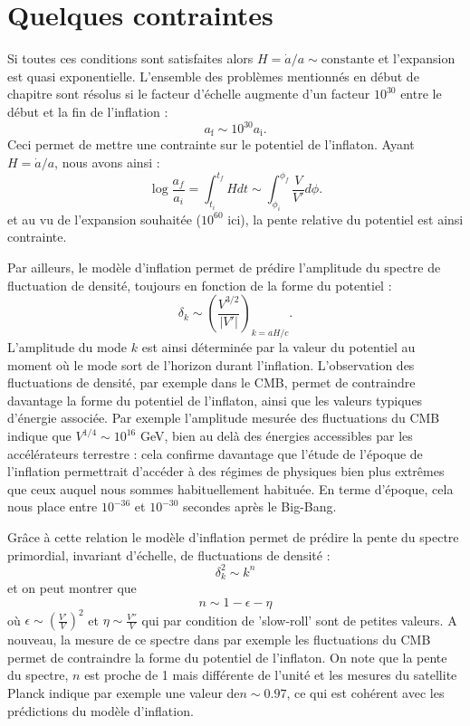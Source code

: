 \section{Quelques contraintes}
Si toutes ces conditions sont satisfaites alors $H=\dot a /a \sim \mathrm{constante}$ et l'expansion est quasi exponentielle. L'ensemble des problèmes mentionnés en début de chapitre sont résolus si le facteur d'échelle augmente d'un facteur $10^{30}$ entre le début et la fin de l'inflation :
\begin{equation}
a_\mathrm{f}\sim 10^{30} a_\mathrm{i}.
\end{equation}
Ceci permet de mettre une contrainte sur le potentiel de l'inflaton. Ayant $H=\dot a/a$, nous avons ainsi :
\begin{equation}
\log \frac{a_f}{a_i}=\int_{t_i}^{t_f} H dt \sim \int_{\phi_i}^{\phi_f}\frac{V}{V'}d \phi.
\end{equation}
et au vu de l'expansion souhaitée ($10^{60}$ ici), la pente relative du potentiel est ainsi contrainte.

Par ailleurs, le modèle d'inflation permet de prédire l'amplitude du spectre de fluctuation de densité, toujours en fonction de la forme du potentiel :
\begin{equation}
\delta_k\sim \left(\frac{V^{3/2}}{|V'|}\right)_{k=aH/c}.
\end{equation}
L'amplitude du mode $k$ est ainsi déterminée par la valeur du potentiel au moment où le mode sort de l'horizon durant l'inflation. L'observation des fluctuations de densité, par exemple dans le CMB, permet de contraindre davantage la forme du potentiel de l'inflaton, ainsi que les valeurs typiques d'énergie associée. Par exemple l'amplitude mesurée des fluctuations du CMB indique que $V^{1/4}\sim 10^{16}$ GeV, bien au delà des énergies accessibles par les accélérateurs terrestre : cela confirme davantage que l'étude de l'époque de l'inflation permettrait d'accéder à des régimes de physiques bien plus extrêmes que ceux auquel nous sommes habituellement habituée. En terme d'époque, cela nous place entre $10^{-36}$ et $10^{-30}$ secondes après le Big-Bang. 

Grâce à cette relation le modèle d'inflation permet de prédire la pente du spectre primordial, invariant d'échelle, de fluctuations de densité :
\begin{equation}
\delta^2_k\sim k^n
\end{equation}
et on peut montrer que 
\begin{equation}
n\sim 1-\epsilon -\eta
\end{equation}
où $\epsilon\sim (\frac{V'}{V})^2$ et $\eta \sim \frac{V''}{V}$ qui par condition de 'slow-roll' sont de petites valeurs. A nouveau, la mesure de ce spectre dans par exemple les fluctuations du CMB permet de contraindre la forme du potentiel de l'inflaton. On note que la pente du spectre, $n$ est proche de 1 mais différente de l'unité et les mesures du satellite Planck indique par exemple une valeur de$n\sim 0.97$, ce qui est cohérent avec les prédictions du modèle d'inflation.

